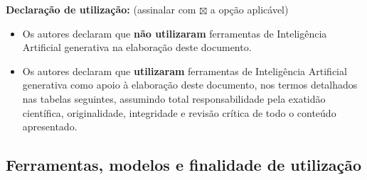 
\begin{campotexto}
\end{campotexto}

\noindent\textbf{Declaração de utilização:} (assinalar com $\boxtimes$ a opção aplicável)
\begin{itemize}[leftmargin=1.4em, itemsep=3pt, topsep=4pt]
  \item[$\square$] Os autores declaram que \textbf{não utilizaram} ferramentas de Inteligência Artificial generativa na elaboração deste documento.
  \item[$\square$] Os autores declaram que \textbf{utilizaram} ferramentas de Inteligência Artificial generativa como apoio à elaboração deste documento, nos termos detalhados nas tabelas seguintes, assumindo total responsabilidade pela exatidão científica, originalidade, integridade e revisão crítica de todo o conteúdo apresentado.
\end{itemize}

\subsection{Ferramentas, modelos e finalidade de utilização}

